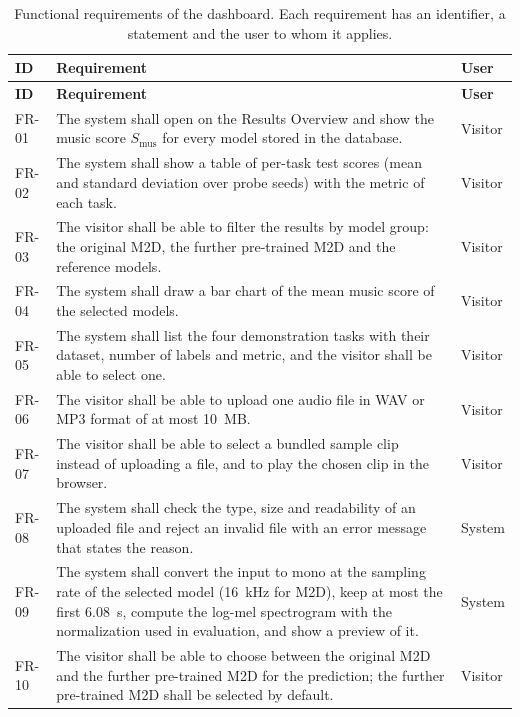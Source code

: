 \documentclass{FastFyp}
\begin{document}
{\small\singlespacing
\begin{longtable}{P{1.3cm}P{11.25cm}P{2.0cm}}
\caption[Functional requirements of the dashboard]{Functional requirements of the dashboard. Each requirement has an identifier, a statement and the user to whom it applies.}\label{tab:srs-fr}\\
\toprule
\textbf{ID} & \textbf{Requirement} & \textbf{User}\\
\midrule
\endfirsthead
\toprule
\textbf{ID} & \textbf{Requirement} & \textbf{User}\\
\midrule
\endhead
\bottomrule
\endfoot
FR-01 & The system shall open on the Results Overview and show the music score $S_{\mathrm{mus}}$ for every model stored in the database. & Visitor\\
FR-02 & The system shall show a table of per-task test scores (mean and standard deviation over probe seeds) with the metric of each task. & Visitor\\
FR-03 & The visitor shall be able to filter the results by model group: the original M2D, the further pre-trained M2D and the reference models. & Visitor\\
FR-04 & The system shall draw a bar chart of the mean music score of the selected models. & Visitor\\
FR-05 & The system shall list the four demonstration tasks with their dataset, number of labels and metric, and the visitor shall be able to select one. & Visitor\\
FR-06 & The visitor shall be able to upload one audio file in WAV or MP3 format of at most 10~MB. & Visitor\\
FR-07 & The visitor shall be able to select a bundled sample clip instead of uploading a file, and to play the chosen clip in the browser. & Visitor\\
FR-08 & The system shall check the type, size and readability of an uploaded file and reject an invalid file with an error message that states the reason. & System\\
FR-09 & The system shall convert the input to mono at the sampling rate of the selected model (16~kHz for M2D), keep at most the first 6.08~s, compute the log-mel spectrogram with the normalization used in evaluation, and show a preview of it. & System\\
FR-10 & The visitor shall be able to choose between the original M2D and the further pre-trained M2D for the prediction; the further pre-trained M2D shall be selected by default. & Visitor\\

\end{longtable}}
\end{document}
